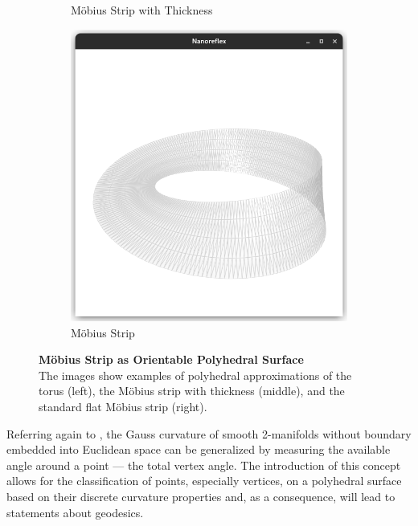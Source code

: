 \documentclass{stdlocal}
\begin{document}
\begin{figure}[t]
\begin{subfigure}[b]{0.32\linewidth}
      \caption{Möbius Strip with Thickness}
    \end{subfigure}
    \hfill
    \begin{subfigure}[b]{0.32\linewidth}
      \centering
      \includegraphics[width=\linewidth,trim={25px 50 25 200},clip]{images/polyhedral-surface-mobius-flat.png}
      \caption{Möbius Strip}
    \end{subfigure}
    \caption[Möbius Strip as Orientable Polyhedral Surface]{%
      \textbf{Möbius Strip as Orientable Polyhedral Surface}\\
      The images show examples of polyhedral approximations of the torus (left), the Möbius strip with thickness (middle), and the standard flat Möbius strip (right).
    }
    \label{fig:oriented-polyhedral-surface-examples}
  \end{figure}

  Referring again to \textcite{polthier2006}, the Gauss curvature of smooth 2-manifolds without boundary embedded into Euclidean space can be generalized by measuring the available angle around a point --- the total vertex angle.
  The introduction of this concept allows for the classification of points, especially vertices, on a polyhedral surface based on their discrete curvature properties and, as a consequence, will lead to statements about geodesics.
\end{document}
